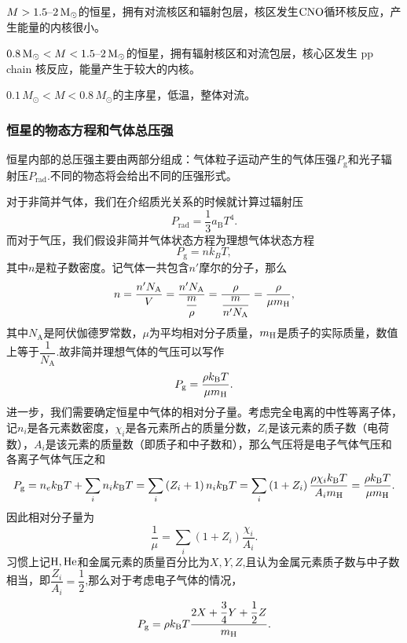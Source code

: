 \documentclass[../天体物理基础.tex]{subfiles}
\begin{document}
$M>1.5\text{\textendash}2\,\unit{M_{\odot}}$的恒星，拥有对流核区和辐射包层，核区发生$\ce{CNO}$循环核反应，产生能量的内核很小。

$0.8\,\unit{M_{\odot}}<M<1.5\text{\textendash}2\,\unit{M_{\odot}}$的恒星，拥有辐射核区和对流包层，核心区发生 pp chain 核反应，能量产生于较大的内核。

$0.1\,\unit{M_{\odot}}<M<0.8\,\unit{M_{\odot}}$的主序星，低温，整体对流。

\subsubsection{恒星的物态方程和气体总压强}
恒星内部的总压强主要由两部分组成：气体粒子运动产生的气体压强$P_{\text{g}}$和光子辐射压$P_{\text{rad}}$.不同的物态将会给出不同的压强形式。

对于非简并气体，我们在介绍质光关系的时候就计算过辐射压
\begin{equation}
P_{\text{rad}}=\frac{1}{3}a_{\text{B}}T^{4}.
\end{equation}
而对于气压，我们假设非简并气体状态方程为理想气体状态方程
\begin{equation}
P_{\text{g}}=nk_{B}T,
\end{equation}
其中$n$是粒子数密度。记气体一共包含$n'$摩尔的分子，那么
\begin{equation}
n=\frac{n'N_{\text{A}}}{V}=\frac{n'N_{\text{A}}}{\dfrac{m}{\rho}}=\frac{\rho}{\dfrac{m}{n'N_{\text{A}}}}=\frac{\rho}{\mu m_{\ce{H}}},
\end{equation}
其中$N_{\text{A}}$是阿伏伽德罗常数，$\mu$为平均相对分子质量，$m_{\ce{H}}$是质子的实际质量，数值上等于$\dfrac{1}{N_{\text{A}}}$.故非简并理想气体的气压可以写作
\begin{equation}
P_{\text{g}}=\frac{\rho k_{\text{B}}T}{\mu m_{\ce{H}}}.
\end{equation}
进一步，我们需要确定恒星中气体的相对分子量。考虑完全电离的中性等离子体，记$n_{i}$是各元素数密度，$\chi_{i}$是各元素所占的质量分数，$Z_{i}$是该元素的质子数（电荷数），$A_{i}$是该元素的质量数（即质子和中子数和），那么气压将是电子气体气压和各离子气体气压之和
\begin{equation}
P_{\text{g}}=n_{e}k_{\text{B}}T+\sum_{i}n_{i}k_{\text{B}}T=\sum_{i}\left(Z_{i}+1\right)n_{i}k_{\text{B}}T=\sum_{i}\left(1+Z_{i}\right)\frac{\rho\chi_{i}k_{\text{B}}T}{A_{i}m_{\ce{H}}}=\frac{\rho k_{\text{B}}T}{\mu m_{\ce{H}}}.
\end{equation}
因此相对分子量为
\begin{equation}
\frac{1}{\mu}=\sum_{i}\left(1+Z_{i}\right)\frac{\chi_{i}}{A_{i}}.
\end{equation}
习惯上记$\ce{H},\ce{He}$和金属元素的质量百分比为$X,Y,Z$,且认为金属元素质子数与中子数相当，即$\dfrac{Z_{i}}{A_{i}}=\dfrac{1}{2}$,那么对于考虑电子气体的情况，
\begin{equation}
P_{\text{g}}=\rho k_{\text{B}}T\frac{2X+\dfrac{3}{4}Y+\dfrac{1}{2}Z}{m_{\ce{H}}}.
\end{equation}
\end{document}
